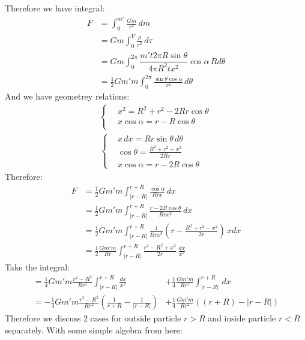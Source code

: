 \documentclass[11pt, a4paper, oneside]{book}
\numberwithin{equation}{section}%
\begin{document}
 Therefore we have integral:
 \begin{align}
 	F &= \int^{m'}_0 \frac{Gm}{r^2}\,dm\\
 	&=Gm\int^V_0 \frac{\rho}{r^2}\,d\tau\\
 	&=Gm\int^{2\pi}_0 \dfrac{m' t 2\pi R\sin\theta}{4\pi R^2 t x^2}\cos\alpha\,Rd\theta\\
 	&=\frac{1}{2}Gm'm\int^{2\pi}_0 \frac{\sin\theta\cos\alpha}{x^2}\,d\theta
 \end{align}
And we have geometrey relations:
\begin{align}
\left\{
\begin{aligned}
&x^2 = R^2 + r^2 - 2Rr\cos\theta\\
&x\cos\alpha = r - R\cos\theta\\
\end{aligned} 
\right.\\
\left\{
\begin{aligned}
&x\,dx = Rr\sin\theta\,d\theta\\
&\cos\theta = \frac{R^2+r^2-x^2}{2Rr}\\
&x\cos\alpha = r - 2R\cos\theta
\end{aligned} 
\right.
\end{align}
Therefore:
\begin{align}
	F &= \frac{1}{2}Gm'm\int^{r+R}_{\left|r-R\right|} \frac{\cos\alpha}{Rrx}\,dx\\
	&= \frac{1}{2}Gm'm\int^{r+R}_{\left|r-R\right|} \frac{r - 2R\cos\theta}{Rrx^2}\,dx\\
	&=\frac{1}{2}Gm'm\int^{r+R}_{\left|r-R\right|} \frac{1}{Rrx^3}\left(r - \frac{R^2+r^2-x^2}{2r}\right)\,xdx\\
	&=\frac{1}{2}\frac{Gm'm}{Rr}\int^{r+R}_{\left|r-R\right|} \frac{r^2-R^2+x^2}{2r}\,\frac{dx}{x^2}
	\end{align}
	Take the integral:
	\begin{align}
	=\frac{1}{4}Gm'm\frac{r^2-R^2}{Rr^2}\int^{r+R}_{\left|r-R\right|} \frac{dx}{x^2} &+ \frac{1}{4}\frac{Gm'm}{Rr^2}\int^{r+R}_{\left|r-R\right|}\,dx\\
	=-\frac{1}{4}Gm'm\frac{r^2-R^2}{Rr^2}
	\left(\frac{1}{r+R}-\frac{1}{\left|r-R\right|}\right) &+ 
	\frac{1}{4}\frac{Gm'm}{Rr^2}
	\left((r+R)-\left|r-R\right|\right)
\end{align}
Therefore we discuss 2 cases for outside particle $r>R$ and  inside particle $r<R$ separately. With some simple algebra from here:
\end{document}

